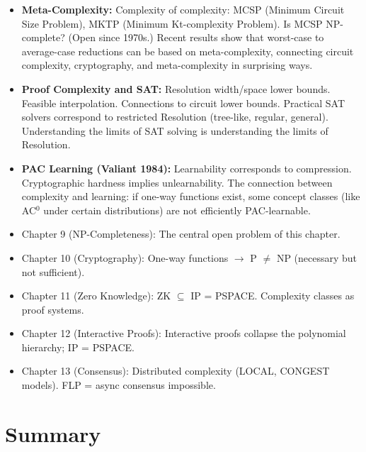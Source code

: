 \begin{itemize}
\item \textbf{Meta-Complexity:} Complexity of complexity: MCSP (Minimum Circuit Size Problem), MKTP (Minimum Kt-complexity Problem). Is MCSP NP-complete? (Open since 1970s.) Recent results show that worst-case to average-case reductions can be based on meta-complexity, connecting circuit complexity, cryptography, and meta-complexity in surprising ways.

\item \textbf{Proof Complexity and SAT:} Resolution width/space lower bounds. Feasible interpolation. Connections to circuit lower bounds. Practical SAT solvers correspond to restricted Resolution (tree-like, regular, general). Understanding the limits of SAT solving is understanding the limits of Resolution.

\item \textbf{PAC Learning (Valiant 1984):} Learnability corresponds to compression. Cryptographic hardness implies unlearnability. The connection between complexity and learning: if one-way functions exist, some concept classes (like AC$^0$ under certain distributions) are not efficiently PAC-learnable.

\end{itemize}

\begin{itemize}
\item Chapter 9 (NP-Completeness): The central open problem of this chapter.
\item Chapter 10 (Cryptography): One-way functions $\to$ P $\neq$ NP (necessary but not sufficient).
\item Chapter 11 (Zero Knowledge): ZK $\subseteq$ IP = PSPACE. Complexity classes as proof systems.
\item Chapter 12 (Interactive Proofs): Interactive proofs collapse the polynomial hierarchy; IP = PSPACE.
\item Chapter 13 (Consensus): Distributed complexity (LOCAL, CONGEST models). FLP = async consensus impossible.
\end{itemize}

\section{Summary}
\label{sec:complexity:summary}

